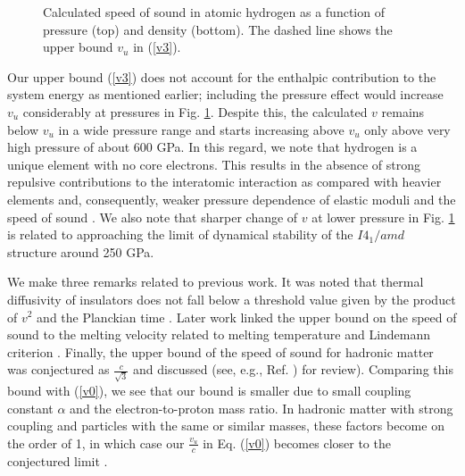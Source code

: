 \documentclass[aps,prl,groupedaddress,fleqn,twocolumn,10pt]{revtex4-1}
\begin{document}
\begin{figure}
\caption{Calculated speed of sound in atomic hydrogen as a function of pressure (top) and density (bottom). The dashed line shows the upper bound $v_u$ in (\ref{v3}).}
\label{abinitio}
\end{figure}

Our upper bound (\ref{v3}) does not account for the enthalpic contribution to the system energy as mentioned earlier; including the pressure effect would increase $v_u$ considerably at pressures in Fig. \ref{abinitio}. Despite this, the calculated $v$ remains below $v_u$ in a wide pressure range and starts increasing above $v_u$ only above very high pressure of about 600 GPa. In this regard, we note that hydrogen is a unique element with no core electrons. This results in the absence of strong repulsive contributions to the interatomic interaction as compared with heavier elements and, consequently, weaker pressure dependence of elastic moduli and the speed of sound \cite{vadim2}. We also note that sharper change of $v$ at lower pressure in Fig. \ref{abinitio} is related to approaching the limit of dynamical stability of the $I4_1/amd$ structure around 250 GPa.

We make three remarks related to previous work. It was noted that thermal diffusivity of insulators does not fall below a threshold value given by the product of $v^2$ and the Planckian time \cite{behnia}. Later work linked the upper bound on the speed of sound to the melting velocity related to melting temperature and Lindemann criterion \cite{hartnoll1}. Finally, the upper bound of the speed of sound for hadronic matter was conjectured as $\frac{c}{\sqrt{3}}$ and discussed (see, e.g., Ref. \cite{hadronic}) for review). Comparing this bound with (\ref{v0}), we see that our bound is smaller due to small coupling constant $\alpha$ and the electron-to-proton mass ratio. In hadronic matter with strong coupling and particles with the same or similar masses, these factors become on the order of 1, in which case our $\frac{v_u}{c}$ in Eq. (\ref{v0}) becomes closer to the conjectured limit \cite{hadronic}.
\end{document}
